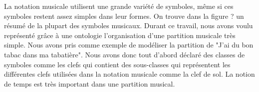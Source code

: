 \documentclass[a4paper]{article}
\begin{document}
La notation musicale utilisent une grande variété de symboles, même si ces symboles restent assez simples dans leur formes.
On trouve dans la figure ? un résumé de la plupart des symboles musicaux.
Durant ce travail, nous avons voulu représenté grâce à une ontologie l'organisation d'une partition musicale très simple.
Nous avons pris comme exemple de modéliser la partition de "J'ai du bon tabac dans ma tabatière".
Nous avons donc tout d'abord déclaré des classes de symboles comme les clefs qui contient des sous-classes qui représentent les différentes clefs utilisées dans la notation musicale comme la clef de sol.
La notion de temps est très important dans une partition musical.
\end{document}
